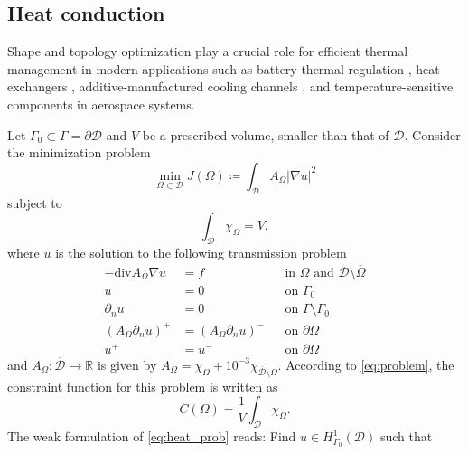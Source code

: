 \documentclass[preprint,9pt]{elsarticle}
\begin{document}
\subsection{Heat conduction}\label{sub:heat}

Shape and topology optimization play a crucial role
for efficient thermal management 
in modern applications such as battery thermal regulation \citep{Mo2021},
heat exchangers \citep{GAO2008805},
additive-manufactured cooling channels \citep{LamarcheGagnon2024}, and
temperature-sensitive components in aerospace systems.

Let $\Gamma_0\subset\Gamma=\partial\mathcal{D}$ and  $V$ be a prescribed volume,
smaller than that of $\mathcal{D}$.
Consider the minimization problem
\begin{equation}\label{eq:heat_cost}
	\min_{\Omega\subset\mathcal{D}}
	J(\Omega)\coloneqq\int_{\mathcal{D}} A_{\Omega}|\nabla u|^{2}
\end{equation}
subject to
\begin{equation}
	\int_{\mathcal{D}} \chi_{\Omega} = V,
\end{equation}
where $u$ is the solution to the following transmission problem
\begin{equation} \label{eq:heat_prob}
\begin{aligned}
-\mathrm{div} A_{\Omega} \nabla u &= f && \text{in } \Omega \text{ and } \mathcal{D}\setminus\overline{\Omega}\\
								u &= 0 && \text{on } \Gamma_{0}\\
					\partial_{n} u &= 0 && \text{on } \Gamma\setminus\Gamma_{0}\\
	(A_{\Omega} \partial_{n} u)^+ &= (A_{\Omega} \partial_{n} u)^- && \text{on }  \partial\Omega\\
								u^+ &= u^- && \text{on }  \partial\Omega        
\end{aligned}	
\end{equation}
and $A_{\Omega}\colon\overline{\mathcal{D}}\to\mathds{R}$ is given by
$A_{\Omega} = \chi_{\Omega} +
	{10}^{-3}\chi_{\overline{\mathcal{D}}\setminus\Omega}.$
According to \eqref{eq:problem}, the constraint function for this problem
is written as
\begin{equation}
	C(\Omega) = \frac{1}{V} \int_{\mathcal{D}} \chi_{\Omega}.
\end{equation}
The weak formulation of \eqref{eq:heat_prob} reads:
Find $u\in H^1_{\Gamma_0}(\mathcal{D})$ such that
\end{document}
